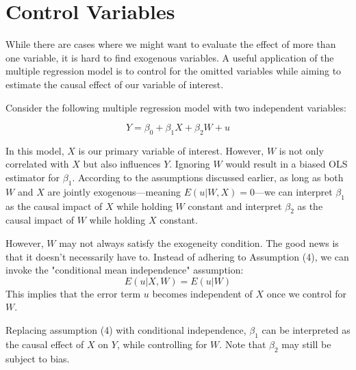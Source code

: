 \documentclass{./../../Latex/handout}
\begin{document}
\section{Control Variables}

While there are cases where we might want to evaluate the effect of more than one variable, it is hard to find exogenous variables. A useful application of the multiple regression model is to control for the omitted variables while aiming to estimate the causal effect of our variable of interest.

Consider the following multiple regression model with two independent variables:

\[
Y = \beta_0 + \beta_1 X + \beta_2 W + u
\]

In this model, \(X\) is our primary variable of interest. However, \(W\) is not only correlated with \(X\) but also influences \(Y\). Ignoring \(W\) would result in a biased OLS estimator for \(\beta_1\). According to the assumptions discussed earlier, as long as both \(W\) and \(X\) are jointly exogenous—meaning \(E(u|W, X) = 0\)—we can interpret \(\beta_1\) as the causal impact of \(X\) while holding \(W\) constant and interpret \(\beta_2\) as the causal impact of \(W\) while holding \(X\) constant.

However, \(W\) may not always satisfy the exogeneity condition. The good news is that it doesn't necessarily have to. Instead of adhering to Assumption (4), we can invoke the "conditional mean independence" assumption:
\[
E(u|X,W) = E(u|W)
\]
This implies that the error term \(u\) becomes independent of \(X\) once we control for \(W\).

Replacing assumption (4) with conditional independence, \(\beta_1\) can be interpreted as the causal effect of \(X\) on \(Y\), while controlling for \(W\). Note that \(\beta_2\) may still be subject to bias.
\end{document}
